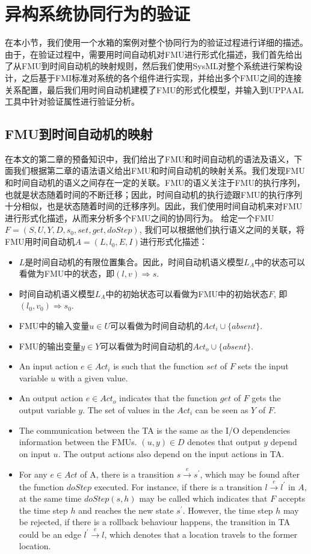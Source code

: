 \section{异构系统协同行为的验证}
在本小节，我们使用一个水箱的案例对整个协同行为的验证过程进行详细的描述。由于，在验证过程中，需要用时间自动机对FMU进行形式化描述，我们首先给出了从FMU到时间自动机的映射规则，然后我们使用SysML对整个系统进行架构设计，之后基于FMI标准对系统的各个组件进行实现，并给出多个FMU之间的连接关系配置，最后我们用时间自动机建模了FMU的形式化模型，并输入到UPPAAL工具中针对验证属性进行验证分析。
\subsection{FMU到时间自动机的映射} 
在本文的第二章的预备知识中，我们给出了FMU和时间自动机的语法及语义，下面我们根据第二章的语法语义给出FMU和时间自动机的映射关系。我们发现FMU和时间自动机的语义之间存在一定的关联。FMU的语义关注于FMU的执行序列，也就是状态随着时间的不断迁移；因此，时间自动机的执行迹跟FMU的执行序列十分相似，也是状态随着时间的迁移序列。因此，我们使用时间自动机来对FMU进行形式化描述，从而来分析多个FMU之间的协同行为。
给定一个FMU$F=(S,U,Y,D,s_{0},set,get,doStep)$, 我们可以根据他们执行语义之间的关联，将FMU用时间自动机$\textit{A}=(L,l_{0},E,I)$进行形式化描述：
\begin{itemize}
\item
$L$是时间自动机的有限位置集合。因此，时间自动机语义模型$L_{\textit{A}}$中的状态可以看做为FMU中的状态，即$(l,v) \Rightarrow s$.
\item
时间自动机语义模型$L_{\textit{A}}$中的初始状态可以看做为FMU中的初始状态$F$, 即$(l_{0},v_{0}) \Rightarrow s_{0}$. 
\item
FMU中的输入变量$u \in U$可以看做为时间自动机的$Act_{i} \cup \{absent\}$.
\item
FMU的输出变量$y \in Y$可以看做为时间自动机的$Act_{o} \cup \{absent\}$.
\item
An input action $e \in Act_{i}$ is such that the function $set$ of $F$ sets the input variable $u$ with a given value. 
\item
An output action $e \in Act_{o}$ indicates that the function $get$ of $F$ gets the output variable $y$. The set of values in the $Act_{i}$ can be seen as $Y$ of $F$.  
\item
The communication between the TA is the same as the I/O dependencies information between the FMUs. $(u,y) \in D$ denotes that output $y$ depend on input $u$. The output actions also depend on the input actions in TA.
\item
For any $e \in Act$ of A, there is a transition $s \xrightarrow{e} s^{\prime}$, which may be found after the function $doStep$ executed. For instance, if there is a transition $l \xrightarrow{e} l^{\prime}$ in $A$, at the same time $doStep(s,h)$ may be called which indicates that $F$ accepts the time step $h$ and reaches the new state $s^{\prime}$. However, the time step $h$ may be rejected, if there is a rollback behaviour happens, the transition in TA could be an edge $l^{\prime} \xrightarrow{e} l$, which denotes that a location travels to the former location.

\end{itemize}
